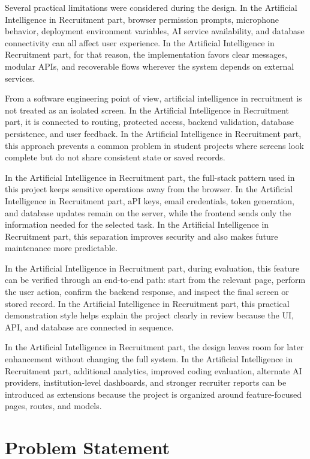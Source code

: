 \documentclass[12pt,a4paper]{report}
\begin{document}
Several practical limitations were considered during the design. In the Artificial Intelligence in Recruitment part, browser permission prompts, microphone behavior, deployment environment variables, AI service availability, and database connectivity can all affect user experience. In the Artificial Intelligence in Recruitment part, for that reason, the implementation favors clear messages, modular APIs, and recoverable flows wherever the system depends on external services.


From a software engineering point of view, artificial intelligence in recruitment is not treated as an isolated screen. In the Artificial Intelligence in Recruitment part, it is connected to routing, protected access, backend validation, database persistence, and user feedback. In the Artificial Intelligence in Recruitment part, this approach prevents a common problem in student projects where screens look complete but do not share consistent state or saved records.


In the Artificial Intelligence in Recruitment part, the full-stack pattern used in this project keeps sensitive operations away from the browser. In the Artificial Intelligence in Recruitment part, aPI keys, email credentials, token generation, and database updates remain on the server, while the frontend sends only the information needed for the selected task. In the Artificial Intelligence in Recruitment part, this separation improves security and also makes future maintenance more predictable.


In the Artificial Intelligence in Recruitment part, during evaluation, this feature can be verified through an end-to-end path: start from the relevant page, perform the user action, confirm the backend response, and inspect the final screen or stored record. In the Artificial Intelligence in Recruitment part, this practical demonstration style helps explain the project clearly in review because the UI, API, and database are connected in sequence.


In the Artificial Intelligence in Recruitment part, the design leaves room for later enhancement without changing the full system. In the Artificial Intelligence in Recruitment part, additional analytics, improved coding evaluation, alternate AI providers, institution-level dashboards, and stronger recruiter reports can be introduced as extensions because the project is organized around feature-focused pages, routes, and models.


\section{Problem Statement}
\end{document}
